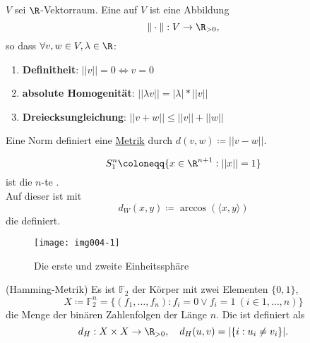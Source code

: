 \begin{example}
  \label{bsp:norm}
  $ V $ sei $ \R $-Vektorraum. Eine  auf $ V $ ist eine Abbildung 
  \begin{equation*}
    \Vert\cdot\Vert : V \to \R_{>0}\text{,}
  \end{equation*}
  so dass $ \forall v, w \in V, \lambda \in \R $:
  \begin{enumerate}
    \item \textbf{Definitheit}: $ ||v|| = 0 \Leftrightarrow v = 0 $
    \item \textbf{absolute Homogenität}: $ ||\lambda v|| = |\lambda| * ||v|| $
    \item \textbf{Dreiecksungleichung}: $ ||v+w|| \leq ||v||+||w|| $
  \end{enumerate}
  Eine Norm definiert eine \hyperref[def:metrik]{Metrik} durch $ d(v, w) \coloneqq ||v-w|| $.
\end{example}

\begin{example}[Einheitssphäre]
  \label{bsp:einheitssphaere}
  \begin{equation*}
    S_1^n \coloneqq \{ x \in \R^{n+1} : ||x|| = 1 \}
  \end{equation*}
  ist die $ n $-te . \\
  Auf dieser ist mit
  \begin{equation*}
     d_W(x, y) \coloneqq \arccos(\langle x, y \rangle)
  \end{equation*}
  die  definiert.

  \begin{figure}[H]
    \label{img004-1}
    \texttt{[image: img004-1]}
    \caption{Die erste und zweite Einheitssphäre}
  \end{figure}
\end{example}

\begin{example}(Hamming-Metrik)
  Es ist $ \mathbb{F}_2 $ der Körper mit zwei Elementen $ \{ 0, 1 \} $,
  \begin{equation*}
    X \coloneqq \mathbb{F}_2^n = \{ (f_1, \dots, f_n) : f_i = 0 \vee f_i = 1 \ (i \in {1, \dots, n}) \}
  \end{equation*}
  die Menge der binären Zahlenfolgen der Länge $ n $. Die  ist definiert als
  \begin{equation*}
    d_H: X \times X \to \R_{>0}, \quad d_H(u,v) = |\{ i : u_i \neq v_i \}|\text{.}
  \end{equation*}
\end{example}